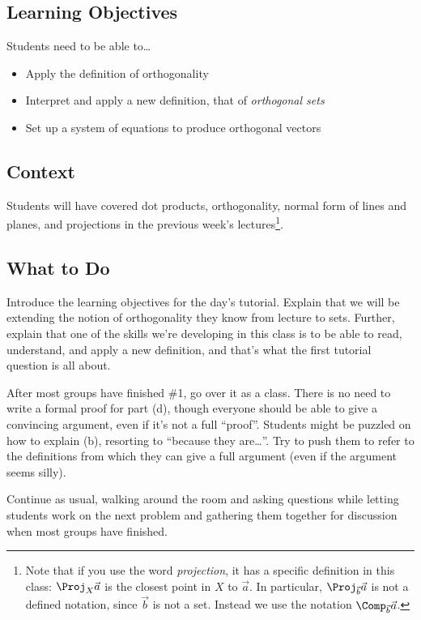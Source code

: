 \subsection*{Learning Objectives}
	Students need to be able to\ldots
	\begin{itemize}
		\item Apply the definition of orthogonality
		\item Interpret and apply a new definition, that of \emph{orthogonal sets}
		\item Set up a system of equations to produce orthogonal vectors
	\end{itemize}

\subsection*{Context}
	Students will have covered dot products, orthogonality, normal form of lines and planes, and
		projections in the previous week's lectures\footnote{ Note that if you use the word \emph{projection},
		it has a specific definition in this class: $\Proj_{X}\vec a$ is the closest point in $X$
		to $\vec a$. In particular, $\Proj_{\vec b}\vec a$ is not a defined notation, since $\vec b$ is
		not a set. Instead we use the notation $\Comp_{\vec b}\vec a$.}.

\subsection*{What to Do}
	Introduce the learning objectives for the day's tutorial. Explain that we will be extending
		the notion of orthogonality they know from lecture to sets. Further, explain that one of the skills
		we're developing in this class is to be able to read, understand, and apply a new definition, and that's
		what the first tutorial question is all about.

	
	After most groups have finished \#1, go over it as a class. There is no need to write a formal
		proof for part (d), though everyone should be able to give a convincing argument, even
		if it's not a full ``proof''. Students might be puzzled on how to explain (b),
		resorting to ``because they are\ldots''. Try to push them to refer to the definitions
		from which they can give a full argument (even if the argument seems silly).

	Continue as usual, walking around the room and asking
		questions while letting students work on the next problem and gathering them together
		for discussion when most groups have finished.

